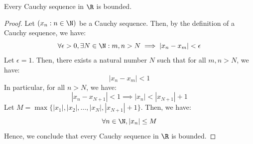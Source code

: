 \documentclass[openany]{book}
\begin{document}
\begin{mytheorem}
    Every Cauchy sequence in $\R$ is bounded.
\end{mytheorem}
\begin{proof}
    Let $(x_n : n \in \N)$ be a Cauchy sequence. Then, by the definition of a Cauchy sequence, we have:
    $$\forall \epsilon > 0, \exists N \in \N: m,n > N \implies |x_n - x_m| < \epsilon$$
    Let $\epsilon = 1$. Then, there exists a natural number $N$ such that for all $m,n > N$, we have:
    $$|x_n - x_m| < 1$$
    In particular, for all $n > N$, we have:
    $$|x_n - x_{N+1}| < 1 \implies |x_n| < |x_{N+1}| + 1$$
    Let $M = \max\{|x_1|, |x_2|, \ldots, |x_N|, |x_{N+1}| + 1\}$. Then, we have:
    $$\forall n \in \N, |x_n| \leq M$$
    Hence, we conclude that every Cauchy sequence in $\R$ is bounded.
\end{proof}
\end{document}
